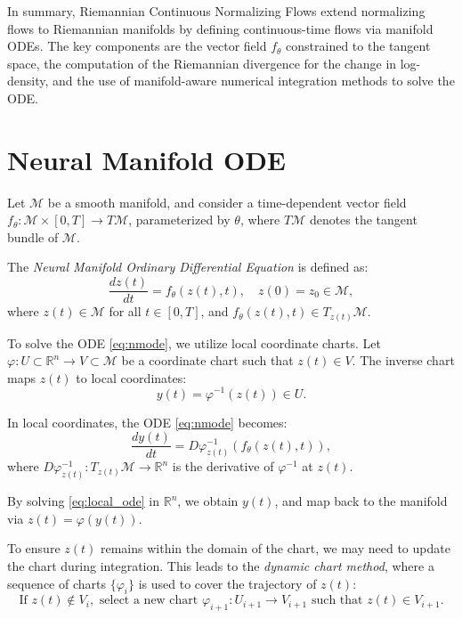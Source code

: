 \documentclass[a4paper,14pt]{article}
\renewcommand{\phi}{\ensuremath{\varphi}}
\theoremstyle{plain} %
\theoremstyle{definition} %
\theoremstyle{remark} %
\begin{document}
	In summary, Riemannian Continuous Normalizing Flows extend normalizing flows to Riemannian manifolds by defining continuous-time flows via manifold ODEs. The key components are the vector field $f_\theta$ constrained to the tangent space, the computation of the Riemannian divergence for the change in log-density, and the use of manifold-aware numerical integration methods to solve the ODE.

	\section{Neural Manifold ODE}
	
	Let $\mathcal{M}$ be a smooth manifold, and consider a time-dependent vector field $f_\theta: \mathcal{M} \times [0, T] \rightarrow T\mathcal{M}$, parameterized by $\theta$, where $T\mathcal{M}$ denotes the tangent bundle of $\mathcal{M}$.
	
	The \emph{Neural Manifold Ordinary Differential Equation} is defined as:
	\begin{equation}
		\frac{dz(t)}{dt} = f_\theta(z(t), t), \quad z(0) = z_0 \in \mathcal{M},
		\label{eq:nmode}
	\end{equation}
	where $z(t) \in \mathcal{M}$ for all $t \in [0, T]$, and $f_\theta(z(t), t) \in T_{z(t)}\mathcal{M}$.
	
	To solve the ODE \eqref{eq:nmode}, we utilize local coordinate charts. Let $\phi: U \subset \mathbb{R}^n \rightarrow V \subset \mathcal{M}$ be a coordinate chart such that $z(t) \in V$. The inverse chart maps $z(t)$ to local coordinates:
	\begin{equation}
		y(t) = \phi^{-1}(z(t)) \in U.
		\label{eq:local_coordinates}
	\end{equation}
	
	In local coordinates, the ODE \eqref{eq:nmode} becomes:
	\begin{equation}
		\frac{dy(t)}{dt} = D\phi^{-1}_{z(t)} \left( f_\theta(z(t), t) \right),
		\label{eq:local_ode}
	\end{equation}
	where $D\phi^{-1}_{z(t)}: T_{z(t)}\mathcal{M} \rightarrow \mathbb{R}^n$ is the derivative of $\phi^{-1}$ at $z(t)$.
	
	By solving \eqref{eq:local_ode} in $\mathbb{R}^n$, we obtain $y(t)$, and map back to the manifold via $z(t) = \phi(y(t))$.
	
	To ensure $z(t)$ remains within the domain of the chart, we may need to update the chart during integration. This leads to the \emph{dynamic chart method}, where a sequence of charts $\{\phi_i\}$ is used to cover the trajectory of $z(t)$:
	\begin{equation}
		\text{If } z(t) \notin V_i, \text{ select a new chart } \phi_{i+1}: U_{i+1} \rightarrow V_{i+1} \text{ such that } z(t) \in V_{i+1}.
		\label{eq:dynamic_chart}
	\end{equation}
	
\end{document}
